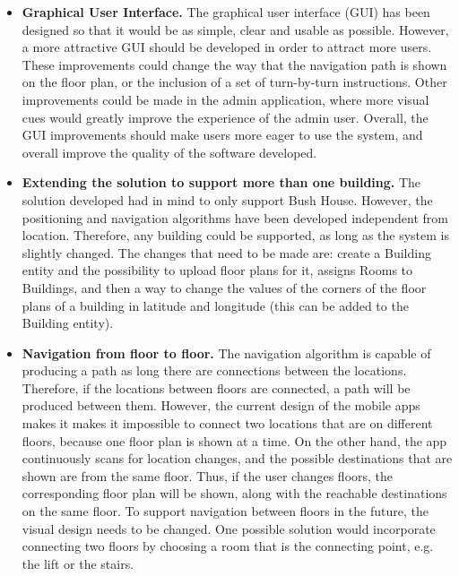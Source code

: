 \begin{itemize}
    \item \textbf{Graphical User Interface.}\newline
    The graphical user interface (GUI) has been designed so that it would be as simple, clear and usable as possible. However, a more attractive GUI should be developed in order to attract more users. These improvements could change the way that the navigation path is shown on the floor plan, or the inclusion of a set of turn-by-turn instructions. Other improvements could be made in the admin application, where more visual cues would greatly improve the experience of the admin user. Overall, the GUI improvements should make users more eager to use the system, and overall improve the quality of the software developed.
    
    \item \textbf{Extending the solution to support more than one building.}\newline
    The solution developed had in mind to only support Bush House. However, the positioning and navigation algorithms have been developed independent from location. Therefore, any building could be supported, as long as the system is slightly changed. The changes that need to be made are: create a Building entity and the possibility to upload floor plans for it, assigns Rooms to Buildings, and then a way to change the values of the corners of the floor plans of a building in latitude and longitude (this can be added to the Building entity).
    
    \item \textbf{Navigation from floor to floor.}\newline
    The navigation algorithm is capable of producing a path as long there are connections between the locations. Therefore, if the locations between floors are connected, a path will be produced between them. However, the current design of the mobile apps makes it makes it impossible to connect two locations that are on different floors, because one floor plan is shown at a time. On the other hand, the app continuously scans for location changes, and the possible destinations that are shown are from the same floor. Thus, if the user changes floors, the corresponding floor plan will be shown, along with the reachable destinations on the same floor. To support navigation between floors in the future, the visual design needs to be changed. One possible solution would incorporate connecting two floors by choosing a room that is the connecting point, e.g. the lift or the stairs.
    
\end{itemize}